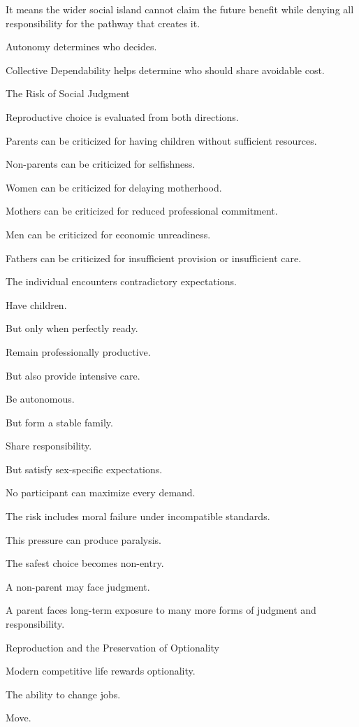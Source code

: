 It means the wider social island cannot claim the future benefit while denying all responsibility for the pathway that creates it.

Autonomy determines who decides.

Collective Dependability helps determine who should share avoidable cost.

The Risk of Social Judgment

Reproductive choice is evaluated from both directions.

Parents can be criticized for having children without sufficient resources.

Non-parents can be criticized for selfishness.

Women can be criticized for delaying motherhood.

Mothers can be criticized for reduced professional commitment.

Men can be criticized for economic unreadiness.

Fathers can be criticized for insufficient provision or insufficient care.

The individual encounters contradictory expectations.

Have children.

But only when perfectly ready.

Remain professionally productive.

But also provide intensive care.

Be autonomous.

But form a stable family.

Share responsibility.

But satisfy sex-specific expectations.

No participant can maximize every demand.

The risk includes moral failure under incompatible standards.

This pressure can produce paralysis.

The safest choice becomes non-entry.

A non-parent may face judgment.

A parent faces long-term exposure to many more forms of judgment and responsibility.

Reproduction and the Preservation of Optionality

Modern competitive life rewards optionality.

The ability to change jobs.

Move.

